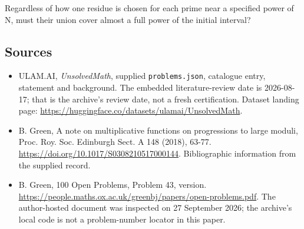 \documentclass[11pt,a4paper]{article}
\begin{document}
Regardless of how one residue is chosen for each prime near a specified power of N, must their union cover almost a full power of the initial interval?

\subsection{Sources}

{\small

\begin{itemize}

\item[\hypertarget{source:statement:1}{S1}] ULAM.AI, \emph{UnsolvedMath}, supplied \texttt{problems.json}, catalogue entry, statement and background. The embedded literature-review date is 2026-08-17; that is the archive’s review date, not a fresh certification. Dataset landing page: \url{https://huggingface.co/datasets/ulamai/UnsolvedMath}.

\item[\hypertarget{source:statement:2}{S2}] B. Green, A note on multiplicative functions on progressions to large moduli, Proc. Roy. Soc. Edinburgh Sect. A 148 (2018), 63-77. \url{https://doi.org/10.1017/S0308210517000144}. Bibliographic information from the supplied record.

\item[\hypertarget{source:statement:3}{S3}] B. Green, 100 Open Problems, Problem 43, version. \url{https://people.maths.ox.ac.uk/greenbj/papers/open-problems.pdf}. The author-hosted document was inspected on 27 September 2026; the archive’s local code is not a problem-number locator in this paper.

\end{itemize}

}

\label{end:statement}
\end{document}
